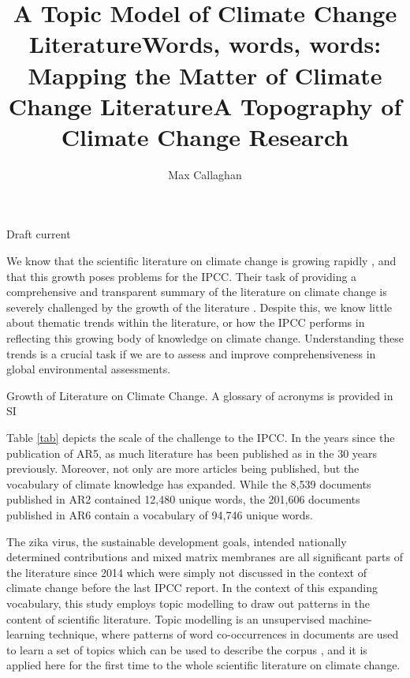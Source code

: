 \documentclass{article}
\title{A Topic Model of Climate Change Literature}
\title{Words, words, words: Mapping the Matter of Climate Change Literature}
\title{A Topography of Climate Change Research}
\author[1,2]{Max Callaghan}
\affil[1]{Mercator Research Institute on Global Commons and Climate Change, Torgauer Straße, 10829 Berlin, Germany}
\affil[2]{School of Earth and Environment, University of Leeds, Leeds LS2 9JT, United Kingdom}
\makeatletter
\renewcommand{\maketitle}{\bgroup\setlength{\parindent}{0pt}
	\begin{flushleft}

		{\huge\textbf{\@title}}

		\bigskip

 		{\large\textbf{\@author}}

 		\bigskip

 		{\large{Draft current \@date}}

	\end{flushleft}\egroup
}
\makeatother
\begin{document}
\maketitle


\begin{linenumbers}

\noindent\textbf{}



\bigskip

\noindent We know that the scientific literature on climate change is growing rapidly \cite{Grieneisen2011}, and that this growth poses problems for the IPCC. Their task of providing a comprehensive and transparent summary of the literature on climate change is severely challenged by the growth of the literature \cite{Minx2017l}. Despite this, we know little about thematic trends within the literature, or how the IPCC performs in reflecting this growing body of knowledge on climate change. Understanding these trends is a crucial task if we are to assess and improve comprehensiveness in global environmental assessments.

\begin{table}
	{\scriptsize
		}
	\caption{Growth of Literature on Climate Change. A glossary of acronyms is provided in SI}
	\label{tab}
\end{table}

Table \ref{tab} depicts the scale of the challenge to the IPCC. In the years since the publication of AR5, as much literature has been published as in the 30 years previously. Moreover, not only are more articles being published, but the vocabulary of climate knowledge has expanded. While the 8,539 documents published in AR2 contained 12,480 unique words, the 201,606 documents published in AR6 contain a vocabulary of 94,746 unique words.

The zika virus, the sustainable development goals, intended nationally determined contributions and mixed matrix membranes are all significant parts of the literature since 2014 which were simply not discussed in the context of climate change before the last IPCC report. In the context of this expanding vocabulary, this study employs topic modelling to draw out patterns in the content of scientific literature. Topic modelling is an unsupervised machine-learning technique, where patterns of word co-occurrences in documents are used to learn a set of topics which can be used to describe the corpus \cite{Blei2012}, and it is applied here for the first time to the whole scientific literature on climate change.


\end{linenumbers}
\end{document}
